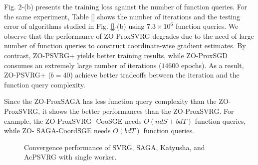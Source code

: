 \documentclass{article}
\theoremstyle{definition}
\theoremstyle{remark}
\begin{document}
{\color{Brown} Fig. 2-(b)
presents the training loss against the number of function queries. For the same experiment, Table \ref{}
shows the number of iterations and the testing error of algorithms studied in Fig. \ref{}-(b) using $7.3 \times 10^6$ function queries. We observe that the performance of ZO-ProxSVRG degrades due to the need of large number of function queries to construct
coordinate-wise gradient estimates. By contrast, ZO-PSVRG+ yields better training results, while
ZO-ProxSGD consumes an extremely large number of iterations ($14600$ epochs). As a result, ZO-PSVRG+
($b = 40$) achieve better tradeoffs between the iteration and the function query complexity.
}




{\color{Green}
Since the ZO-ProxSAGA has less function query complexity
than the ZO-ProxSVRG, it shows the better performances
than the ZO-ProxSVRG. For example, the ZO-ProxSVRG-
CooSGE needs $O(ndS + bdT)$ function queries, while ZO-
SAGA-CoordSGE needs $O(bdT)$  function queries.}

\begin{figure}[htbp]
%
%
%
%
\setlength{\abovecaptionskip}{2pt}
\caption{Convergence performance of SVRG, SAGA, Katyusha, and AcPSVRG with single worker.}
\label{fig:AcPSVRG_seq}
\end{figure}
\end{document}
